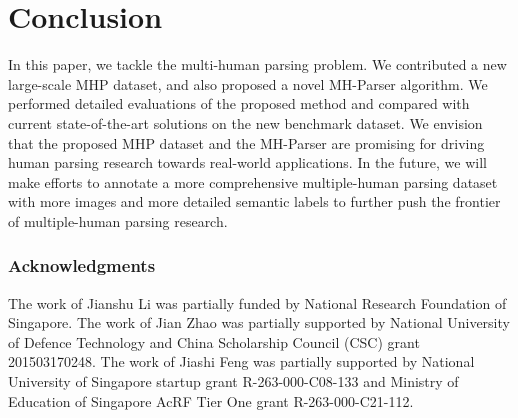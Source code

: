 \documentclass[10pt, letterpaper]{article}
\begin{document}
\section{Conclusion}
In this paper, we tackle the multi-human parsing problem. We contributed a new large-scale MHP dataset, and also proposed a novel MH-Parser algorithm. We performed detailed evaluations of the proposed method and compared with current state-of-the-art solutions on the new benchmark dataset.  We envision that the proposed MHP dataset and the MH-Parser are promising for driving human parsing research towards real-world applications. In the future, we will make efforts to annotate a more comprehensive multiple-human parsing dataset with more images and more detailed semantic labels to further push the frontier of multiple-human parsing research.

\subsubsection*{Acknowledgments}
The work of Jianshu Li was partially funded by National Research Foundation of Singapore. The work of Jian Zhao was partially supported by National University of Defence Technology and China Scholarship Council (CSC) grant 201503170248. The work of Jiashi Feng was partially supported by National University of Singapore startup grant R-263-000-C08-133 and Ministry of Education of Singapore AcRF Tier One grant R-263-000-C21-112.
\end{document}
